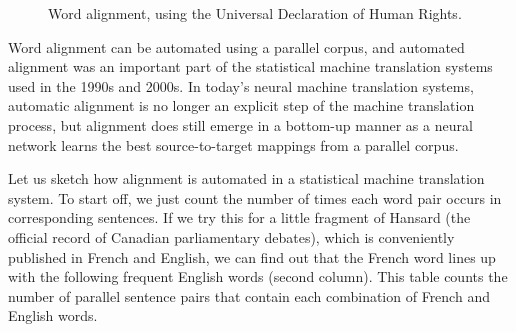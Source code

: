 

\begin{figure}[htb!]
\footnotesize{}
	  \caption{Word alignment, using the Universal Declaration of Human Rights.}
	\label{word:alignment:1a}
\end{figure}

Word alignment can be automated using a parallel corpus, and automated alignment was an important part of the statistical machine translation systems used in the  1990s and 2000s.  In today's neural machine translation systems, automatic alignment is no longer an explicit step of the machine translation process, but alignment does still emerge in a bottom-up manner as a neural network learns the best source-to-target mappings from a parallel corpus.

Let us  sketch how alignment is automated in a statistical machine translation system. To start off, we just count the number of times each word pair occurs in corresponding sentences. If we try this for a little
fragment of Hansard (the official record of Canadian parliamentary debates),  which is conveniently published in French and English, we can find out that the French word  lines up with the following frequent English words (second column).  This table counts the number of parallel sentence pairs that contain each combination of French and English words.


